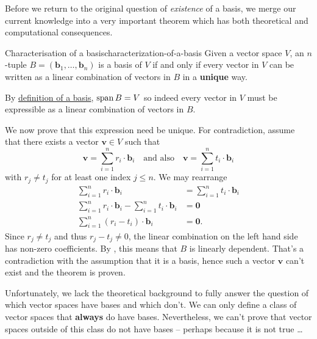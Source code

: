 Before we return to the original question of \emph{existence} of a basis, we
merge our current knowledge into a very important theorem which has both
theoretical and computational consequences.

\begin{theorem}{Characterisation of a basis}{characterization-of-a-basis}
 Given a vector space $V$, an $n$-tuple $B = (\mathbf{b}_1,\ldots,\mathbf{b}_n)$
 is a basis of $V$ if and only if every vector in $V$ can be written as a linear
 combination of vectors in $B$ in a \textbf{unique} way.
\end{theorem}
\begin{thmproof}
 By \hyperref[def:basis]{definition of a basis}, $\operatorname{span} B = V$ so indeed every
 vector in $V$ must be expressible as a linear combination of vectors in $B$.

 We now prove that this expression need be unique. For contradiction, assume
 that there exists a vector $\mathbf{v} \in V$ such that
 \[
  \mathbf{v} = \sum_{i=1}^{n} r_i \cdot \mathbf{b}_i \quad \text{and also} \quad
  \mathbf{v} = \sum_{i=1}^{n} t_i \cdot \mathbf{b}_i
 \]
 with $r_j \neq t_j$ for at least one index $j \leq n$. We may rearrange
 \begin{align*}
  \sum_{i = 1}^{n} r_i \cdot \mathbf{b}_i &= \sum_{i = 1}^{n} t_i \cdot
  \mathbf{b}_i\\
  \sum_{i = 1}^{n} r_i \cdot \mathbf{b}_i - \sum_{i = 1}^{n} t_i \cdot
  \mathbf{b}_i &= \mathbf{0}\\
  \sum_{i = 1}^{n} (r_i - t_i) \cdot \mathbf{b}_i &= \mathbf{0}.
 \end{align*}
 Since $r_j \neq t_j$ and thus $r_j - t_j \neq 0$, the linear combination on the
 left hand side has non-zero coefficients. By
 , this means that $B$
 is linearly dependent. That's a contradiction with the assumption that it is a
 basis, hence such a vector $\mathbf{v}$ can't exist and the theorem is proven.
\end{thmproof}

Unfortunately, we lack the theoretical background to fully answer the question
of which vector spaces have bases and which don't. We can only define a class of
vector spaces that \textbf{always} do have bases. Nevertheless, we can't prove
that vector spaces outside of this class do not have bases -- perhaps because it
is not true \dots

